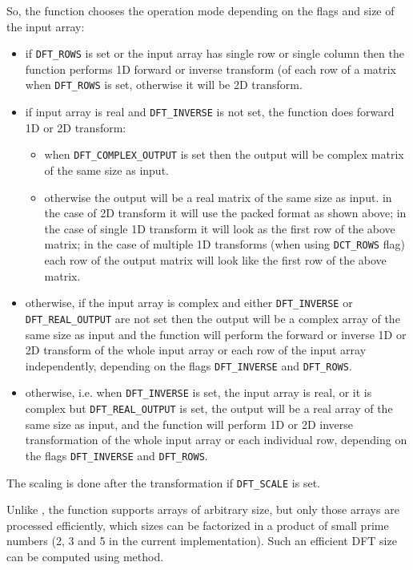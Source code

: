 So, the function chooses the operation mode depending on the flags and size of the input array:
\begin{itemize}
    \item if \texttt{DFT\_ROWS} is set or the input array has single row or single column then the function performs 1D forward or inverse transform (of each row of a matrix when \texttt{DFT\_ROWS} is set, otherwise it will be 2D transform.
    \item if input array is real and \texttt{DFT\_INVERSE} is not set, the function does forward 1D or 2D transform:
    \begin{itemize}
        \item when \texttt{DFT\_COMPLEX\_OUTPUT} is set then the output will be complex matrix of the same size as input.
        \item otherwise the output will be a real matrix of the same size as input. in the case of 2D transform it will use the packed format as shown above; in the case of single 1D transform it will look as the first row of the above matrix; in the case of multiple 1D transforms (when using \texttt{DCT\_ROWS} flag) each row of the output matrix will look like the first row of the above matrix.
    \end{itemize}
    \item otherwise, if the input array is complex and either \texttt{DFT\_INVERSE} or \texttt{DFT\_REAL\_OUTPUT} are not set then the output will be a complex array of the same size as input and the function will perform the forward or inverse 1D or 2D transform of the whole input array or each row of the input array independently, depending on the flags \texttt{DFT\_INVERSE} and \texttt{DFT\_ROWS}.
    \item otherwise, i.e. when \texttt{DFT\_INVERSE} is set, the input array is real, or it is complex but \texttt{DFT\_REAL\_OUTPUT} is set, the output will be a real array of the same size as input, and the function will perform 1D or 2D inverse transformation of the whole input array or each individual row, depending on the flags \texttt{DFT\_INVERSE} and \texttt{DFT\_ROWS}.
\end{itemize}

The scaling is done after the transformation if \texttt{DFT\_SCALE} is set.

Unlike , the function supports arrays of arbitrary size, but only those arrays are processed efficiently, which sizes can be factorized in a product of small prime numbers (2, 3 and 5 in the current implementation). Such an efficient DFT size can be computed using  method.

